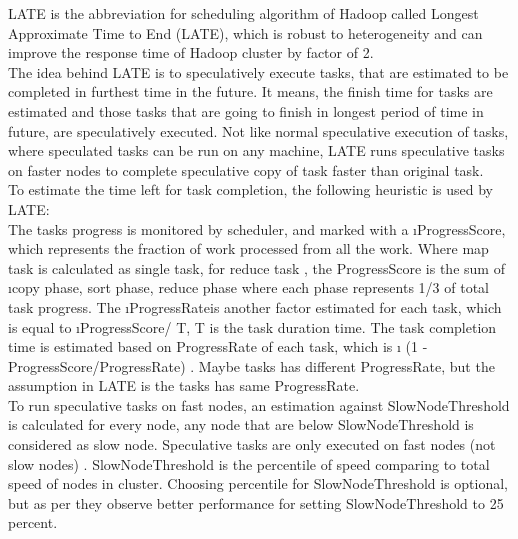 LATE‌ is the abbreviation for scheduling algorithm of Hadoop called Longest Approximate Time to End (LATE), which is robust to heterogeneity and can improve the response time of Hadoop cluster by factor of 2\cite{mat1}. \\

The idea behind LATE‌ is to speculatively execute tasks, that are estimated to be completed in furthest  time in the future. It means, the finish time for tasks are estimated and those tasks that are going to finish in longest period of time in future, are speculatively executed. Not like normal speculative execution of tasks, where speculated tasks can be run on any machine, LATE‌ runs speculative tasks on faster nodes to complete speculative copy of task faster than original task. \\

To estimate the time left for task completion, the following heuristic is used by LATE:\\
 The tasks progress is monitored by scheduler, and marked with a \i{ProgressScore}, which represents the fraction of work processed from all the work. Where map task is calculated as single task, for reduce task ,  the ProgressScore is the sum of \i{copy phase, sort phase, reduce phase}‌ where each phase represents 1/3 of total task progress. 
 The \i{ProgressRate}‌is another factor estimated for each task, which is equal to \i{ProgressScore/ T}, T is the task duration time. The task completion time is estimated based on ProgressRate of each task, which is \i{ (1 - ProgressScore/ProgressRate) }. Maybe tasks has different ProgressRate, but the assumption in LATE‌ is the tasks has same ProgressRate.\\  
  
To run speculative tasks on fast nodes, an estimation against SlowNodeThreshold is calculated for every node, any node that are below SlowNodeThreshold is considered as slow node. Speculative tasks are only executed on fast nodes (not slow nodes) . SlowNodeThreshold is the percentile of speed comparing to total speed of nodes in cluster. Choosing percentile for SlowNodeThreshold is optional, but as per \cite{mat1} they observe better performance for setting SlowNodeThreshold to 25 percent.\\   


